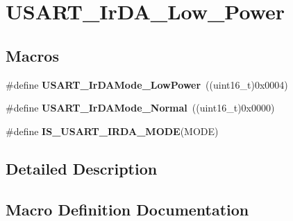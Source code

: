 \hypertarget{group___u_s_a_r_t___ir_d_a___low___power}{}\section{U\+S\+A\+R\+T\+\_\+\+Ir\+D\+A\+\_\+\+Low\+\_\+\+Power}
\label{group___u_s_a_r_t___ir_d_a___low___power}
\subsection*{Macros}
\begin{DoxyCompactItemize}
\item 
\#define {\bfseries U\+S\+A\+R\+T\+\_\+\+Ir\+D\+A\+Mode\+\_\+\+Low\+Power}~((uint16\+\_\+t)0x0004)\hypertarget{group___u_s_a_r_t___ir_d_a___low___power_ga00c2635d0e6ca1a5b158f1c1673e862f}{}\label{group___u_s_a_r_t___ir_d_a___low___power_ga00c2635d0e6ca1a5b158f1c1673e862f}

\item 
\#define {\bfseries U\+S\+A\+R\+T\+\_\+\+Ir\+D\+A\+Mode\+\_\+\+Normal}~((uint16\+\_\+t)0x0000)\hypertarget{group___u_s_a_r_t___ir_d_a___low___power_ga796cd5451deb896741206986bd6d03e6}{}\label{group___u_s_a_r_t___ir_d_a___low___power_ga796cd5451deb896741206986bd6d03e6}

\item 
\#define {\bfseries I\+S\+\_\+\+U\+S\+A\+R\+T\+\_\+\+I\+R\+D\+A\+\_\+\+M\+O\+DE}(M\+O\+DE)
\end{DoxyCompactItemize}


\subsection{Detailed Description}


\subsection{Macro Definition Documentation}

